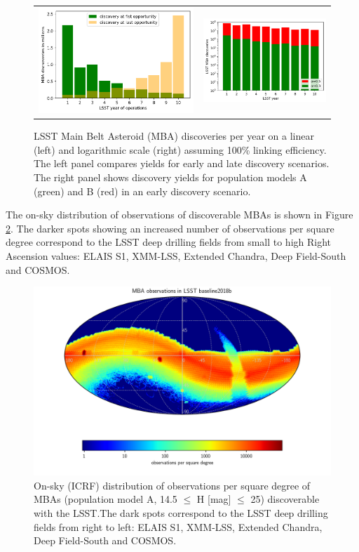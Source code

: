\begin{figure}[tb!]
\begin{center}
\begin{tabular}{cc}
\includegraphics[width=0.5\linewidth]{figs/discovery_time.png} &
\includegraphics[width=0.5\linewidth]{figs/disc_per_yr2.png}
\end{tabular}
\end{center}
\caption{LSST Main Belt Asteroid (MBA) discoveries per year on a linear (left) and logarithmic scale (right) assuming 100\% linking efficiency. The left panel compares yields for early and late discovery scenarios. The right panel shows discovery yields for population models A (green) and \gls{B} (red) in an early discovery scenario.}
\label{fig:mba_disc_yr}       %
\end{figure}
%
The on-sky distribution of observations of discoverable MBAs is shown in Figure \ref{fig:mba_obs_sky}. The darker spots showing an increased number of observations per square degree correspond to the \gls{LSST} deep drilling fields from small to high Right Ascension values: ELAIS S1, \gls{XMM}-LSS, Extended Chandra, Deep Field-South and COSMOS.
\begin{figure}
\begin{center}
\includegraphics[width=0.70\linewidth]{figs/mba_obs_hpmap.png}
\end{center}
\caption{On-sky (ICRF) distribution of observations per square degree of MBAs (population model A, 14.5 $\le$ H [mag] $\le$ 25) discoverable with the \gls{LSST}.The dark spots correspond to the \gls{LSST} deep drilling fields from right to left: ELAIS S1, \gls{XMM}-LSS, Extended Chandra, Deep Field-South and COSMOS.}
\label{fig:mba_obs_sky}       %
\end{figure}
